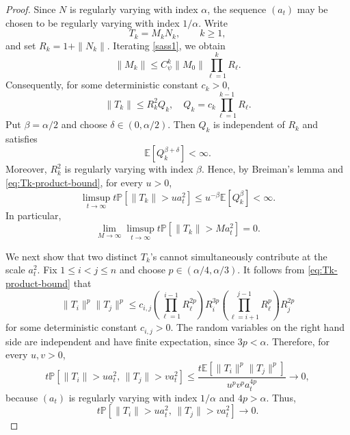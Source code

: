 \documentclass[preprint,12pt]{elsarticle}
\theoremstyle{definition}
\theoremstyle{remark}
\newcommand{\Mbf}{{ M}}
\newcommand{\Nbf}{{ N}}
\newcommand{\Tbf}{{ T}}
\newcommand{\1}{{\mathbf 1}}
\numberwithin{equation}{section}
\newcommand{\Ebb}{\mathbb{E}}  %
\newcommand{\Pbb}{\mathbb{P}}
\begin{document}
  \begin{proof}
    Since $\Nbf$ is regularly varying with index $\alpha$, the sequence
    $(a_t)$ may be chosen to be regularly varying with index $1/\alpha$. Write
    \begin{equation*}
      \Tbf_k=\Mbf_k\Nbf_k,
      \qquad k\geq1,
    \end{equation*}
    and set $R_k=1+\|\Nbf_k\|$.
    Iterating \eqref{sass1}, we obtain
    \begin{equation*}
      \|\Mbf_k\|
      \leq C_\psi^k\|\Mbf_0\|
      \prod_{\ell=1}^kR_\ell.
    \end{equation*}
    Consequently, for some deterministic constant $c_k>0$,
    \begin{equation}\label{eq:Tk-product-bound}
      \|\Tbf_k\|
      \leq R_k^2 Q_k, \quad 
      Q_k=c_k\prod_{\ell=1}^{k-1}R_\ell. 
    \end{equation}
    Put $\beta=\alpha/2$ and choose $\delta \in (0,\alpha/2)$.
    Then $Q_k$ is independent of $R_k$ and satisfies
    \begin{equation*}
      \Ebb[Q_k^{\beta+\delta}]<\infty.
    \end{equation*}
    Moreover, $R_k^2$ is regularly varying with index $\beta$. Hence,
    by Breiman's lemma and \eqref{eq:Tk-product-bound}, for every $u>0$,
    \begin{equation*}\label{eq:Tk-tail-bound}
      \limsup_{t\to\infty}
      t\Pbb[\|\Tbf_k\|>u a_t^2]
      \leq u^{-\beta}\Ebb[Q_k^\beta]
      <\infty.
    \end{equation*}
    In particular,
    \begin{equation*}\label{eq:Tk-tail-tightness}
      \lim_{M\to\infty}\limsup_{t\to\infty}
      t\Pbb[\|\Tbf_k\|>M a_t^2]=0.
    \end{equation*}

    We next show that two distinct $\Tbf_k$'s cannot simultaneously contribute
    at the scale $a_t^2$. Fix $1\leq i<j\leq n$ and choose
    $p\in(\alpha/4,\alpha/3)$.    
      It follows from \eqref{eq:Tk-product-bound} that
    \begin{equation*}
      \|\Tbf_i\|^p\|\Tbf_j\|^p
      \leq c_{i,j}
      \left(\prod_{\ell=1}^{i-1}R_\ell^{2p}\right)
      R_i^{3p}
      \left(\prod_{\ell=i+1}^{j-1}R_\ell^p\right)
      R_j^{2p}
    \end{equation*}
    for some deterministic constant $c_{i,j}>0$. 
    The random variables on the right hand side
    are independent and have finite expectation, 
    since $3p<\alpha$. Therefore, for every
    $u,v>0$,
    \begin{equation*}
      t\Pbb\left[
        \|\Tbf_i\|>u a_t^2,\,
        \|\Tbf_j\|>v a_t^2
      \right] 
      \leq
      \frac{
        t\Ebb[\|\Tbf_i\|^p\|\Tbf_j\|^p]
      }{
        u^pv^pa_t^{4p}
      }
      \longrightarrow0,
    \end{equation*}
    because $(a_t)$ is regularly varying with index $1/\alpha$ and
    $4p>\alpha$. Thus,
    \begin{equation*}\label{eq:pairwise-negligibility}
      t\Pbb\left[
        \|\Tbf_i\|>u a_t^2,\,
        \|\Tbf_j\|>v a_t^2
      \right]
      \longrightarrow0.
    \end{equation*}


\end{proof}
\end{document}
